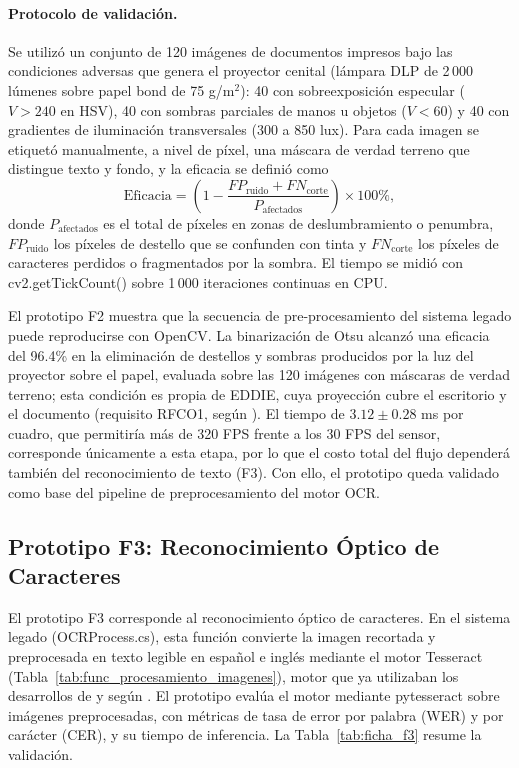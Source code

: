 \paragraph{Protocolo de validación.} Se utilizó un conjunto de 120 imágenes de documentos impresos bajo las condiciones adversas que genera el proyector cenital (lámpara DLP de 2\,000 lúmenes sobre papel bond de 75 g/m$^2$): 40 con sobreexposición especular ($V > 240$ en HSV), 40 con sombras parciales de manos u objetos ($V < 60$) y 40 con gradientes de iluminación transversales (300 a 850 lux). Para cada imagen se etiquetó manualmente, a nivel de píxel, una máscara de verdad terreno que distingue texto y fondo, y la eficacia se definió como
\[ \mathrm{Eficacia} = \left(1 - \frac{FP_{\mathrm{ruido}} + FN_{\mathrm{corte}}}{P_{\mathrm{afectados}}}\right) \times 100\%, \]
donde $P_{\mathrm{afectados}}$ es el total de píxeles en zonas de deslumbramiento o penumbra, $FP_{\mathrm{ruido}}$ los píxeles de destello que se confunden con tinta y $FN_{\mathrm{corte}}$ los píxeles de caracteres perdidos o fragmentados por la sombra. El tiempo se midió con cv2.getTickCount() sobre 1\,000 iteraciones continuas en CPU.
 
El prototipo F2 muestra que la secuencia de pre-procesamiento del sistema legado puede reproducirse con OpenCV. La binarización de Otsu alcanzó una eficacia del 96.4\% en la eliminación de destellos y sombras producidos por la luz del proyector sobre el papel, evaluada sobre las 120 imágenes con máscaras de verdad terreno; esta condición es propia de EDDIE, cuya proyección cubre el escritorio y el documento (requisito RFCO1, según \cite{ibaceta2023evaluacion}). El tiempo de $3.12 \pm 0.28$ ms por cuadro, que permitiría más de 320 FPS frente a los 30 FPS del sensor, corresponde únicamente a esta etapa, por lo que el costo total del flujo dependerá también del reconocimiento de texto (F3). Con ello, el prototipo queda validado como base del pipeline de preprocesamiento del motor OCR.
 
\subsection{Prototipo F3: Reconocimiento Óptico de Caracteres}
 
El prototipo F3 corresponde al reconocimiento óptico de caracteres. En el sistema legado (OCRProcess.cs), esta función convierte la imagen recortada y preprocesada en texto legible en español e inglés mediante el motor Tesseract (Tabla~\ref{tab:func_procesamiento_imagenes}), motor que ya utilizaban los desarrollos de \cite{carrasco2017diseno} y \cite{contreras2019desarrollo} según \cite{ibaceta2023evaluacion}. El prototipo evalúa el motor mediante pytesseract sobre imágenes preprocesadas, con métricas de tasa de error por palabra (WER) y por carácter (CER), y su tiempo de inferencia. La Tabla~\ref{tab:ficha_f3} resume la validación.
 
